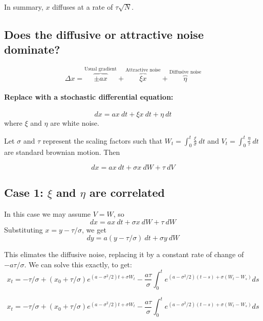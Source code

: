 \documentclass[11pt]{article}
\begin{document}
In summary, \(x\) diffuses at a rate of \(\tau\sqrt{N}\).

    \hypertarget{does-the-diffusive-or-attractive-noise-dominate}{%
\subsection{Does the diffusive or attractive noise
dominate?}\label{does-the-diffusive-or-attractive-noise-dominate}}

\[ \Delta x =
    \overset{\text{Usual gradient}}{\overbrace{\pm ax}} 
    +\overset{\text{Attractive noise}}{\overbrace{\xi x}}+\overset{\text{Diffusive noise}}{\overbrace{\eta}}\]

\hypertarget{replace-with-a-stochastic-differential-equation}{%
\paragraph{Replace with a stochastic differential
equation:}\label{replace-with-a-stochastic-differential-equation}}

\[dx = ax \:dt+\xi x \:dt +\eta\: dt\] where \(\xi\) and \(\eta\) are
white noise.

    Let \(\sigma\) and \(\tau\) represent the scaling factors such that
\(W_t=\int_0^t\frac{\xi}{\sigma}\:dt\) and
\(V_t=\int_0^t\frac{\eta}{\tau}\:dt\) are standard brownian motion. Then

\[dx = ax \:dt+\sigma x \:dW +\tau\: dV\]

    \hypertarget{case-1-xi-and-eta-are-correlated}{%
\subsection{\texorpdfstring{Case 1: \(\xi\) and \(\eta\) are
correlated}{Case 1: \textbackslash{}xi and \textbackslash{}eta are correlated}}\label{case-1-xi-and-eta-are-correlated}}

In this case we may assume \(V = W\), so
\[dx = ax \:dt+\sigma x \:dW +\tau\: dW\] Substituting
\(x = y-\tau/\sigma\), we get
\[dy = a(y-\tau/\sigma) \:dt  + \sigma y \:dW\]

This elimates the diffusive noise, replacing it by a constant rate of
change of \(-a\tau/\sigma\). We can solve this exactly, to get:
\[x_t = -\tau/\sigma+(x_0+\tau/\sigma)e^{(a-\sigma^2/2)t+\sigma W_t}-\frac{a\tau}{\sigma}\int_0^t e^{(a-\sigma^2/2)(t-s)+\sigma (W_t-W_s)}ds\]

    \[x_t = -\tau/\sigma+(x_0+\tau/\sigma)e^{(a-\sigma^2/2)t+\sigma W_t}-\frac{a\tau}{\sigma}\int_0^t e^{(a-\sigma^2/2)(t-s)+\sigma (W_t-W_s)}ds\]
\end{document}
